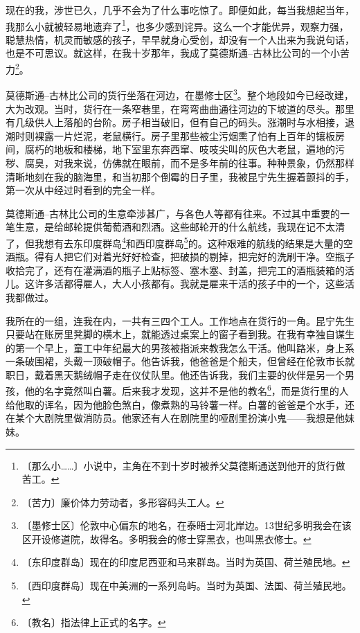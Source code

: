 \documentclass[12pt,UTF-8,openany]{ctexbook}
\begin{document}
\begin{normalsize}
    
    现在的我，涉世已久，几乎不会为了什么事吃惊了。即便如此，每当我想起当年，我那么小就被轻易地遗弃了\footnote{〔那么小……〕小说中，主角在不到十岁时被养父莫德斯通送到他开的货行做苦工。}，也多少感到诧异。这么一个才能优异，观察力强，聪慧热情，机灵而敏感的孩子，早早就身心受创，却没有一个人出来为我说句话，也是不可思议。就这样，在我十岁那年，我成了莫德斯通–古林比公司的一个小苦力\footnote{〔苦力〕廉价体力劳动者，多形容码头工人。}。
    
    莫德斯通–古林比公司的货行坐落在河边，在墨修士区\footnote{〔墨修士区〕伦敦中心偏东的地名，在泰晤士河北岸边。13世纪多明我会在该区开设修道院，故得名。多明我会的修士穿黑衣，也叫黑衣修士。}。整个地段如今已经改建，大为改观。当时，货行在一条窄巷里，在弯弯曲曲通往河边的下坡道的尽头。那里有几级供人上落船的台阶。房子相当破旧，但有自己的码头。涨潮时与水相接，退潮时则裸露一片烂泥，老鼠横行。房子里那些被尘污烟熏了怕有上百年的镶板房间，腐朽的地板和楼梯，地下室里东奔西窜、吱吱尖叫的灰色大老鼠，遍地的污秽、腐臭，对我来说，仿佛就在眼前，而不是多年前的往事。种种景象，仍然那样清晰地刻在我的脑海里，和当初那个倒霉的日子里，我被昆宁先生握着颤抖的手，第一次从中经过时看到的完全一样。
    
    莫德斯通–古林比公司的生意牵涉甚广，与各色人等都有往来。不过其中重要的一笔生意，是给邮轮提供葡萄酒和烈酒。这些邮轮开的什么航线，我现在记不太清了，但我想有去东印度群岛\footnote{〔东印度群岛〕现在的印度尼西亚和马来群岛。当时为英国、荷兰殖民地。}和西印度群岛\footnote{〔西印度群岛〕现在中美洲的一系列岛屿。当时为英国、法国、荷兰殖民地。}的。这种艰难的航线的结果是大量的空酒瓶。得有人把它们对着光好好检查，把破损的剔掉，把完好的洗刷干净。空瓶子收拾完了，还有在灌满酒的瓶子上贴标签、塞木塞、封盖，把完工的酒瓶装箱的活儿。这许多活都得雇人，大人小孩都有。我就是雇来干活的孩子中的一个，这些活我都做过。
    
    我所在的一组，连我在内，一共有三四个工人。工作地点在货行的一角。昆宁先生只要站在账房里凳脚的横木上，就能透过桌案上的窗子看到我。在我有幸独自谋生的第一个早上，童工中年纪最大的男孩被指派来教我怎么干活。他叫路米，身上系一条破围裙，头戴一顶破帽子。他告诉我，他爸爸是个船夫，但曾经在伦敦市长就职日，戴着黑天鹅绒帽子走在仪仗队里。他还告诉我，我们主要的伙伴是另一个男孩，他的名字竟然叫白薯。后来我才发现，这并不是他的教名\footnote{〔教名〕指法律上正式的名字。}，而是货行里的人给他取的诨名，因为他脸色煞白，像煮熟的马铃薯一样。白薯的爸爸是个水手，还在某个大剧院里做消防员。他家还有人在剧院里的哑剧里扮演小鬼——我想是他妹妹。
    

\end{normalsize}
\end{document}
